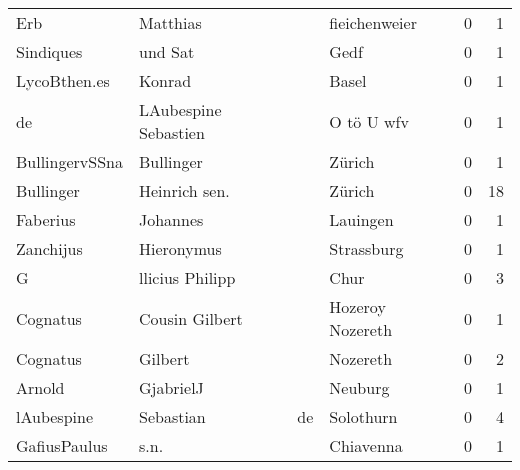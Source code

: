 \begin{tabular}{llllrr}
                      Erb &                           Matthias &             &                               fieichenweier &          0 &         1 \\
                Sindiques &                            und Sat &             &                                        Gedf &          0 &         1 \\
             LycoBthen.es &                             Konrad &             &                                       Basel &          0 &         1 \\
                       de &               LAubespine Sebastien &             &                                  O tö U wfv &          0 &         1 \\
           BullingervSSna &                          Bullinger &             &                                      Zürich &          0 &         1 \\
                Bullinger &                      Heinrich sen. &             &                                      Zürich &          0 &        18 \\
                 Faberius &                           Johannes &             &                                    Lauingen &          0 &         1 \\
                Zanchijus &                         Hieronymus &             &                                  Strassburg &          0 &         1 \\
                        G &                    llicius Philipp &             &                                        Chur &          0 &         3 \\
                 Cognatus &                     Cousin Gilbert &             &                            Hozeroy Nozereth &          0 &         1 \\
                 Cognatus &                            Gilbert &             &                                    Nozereth &          0 &         2 \\
                   Arnold &                          GjabrielJ &             &                                     Neuburg &          0 &         1 \\
               lAubespine &                          Sebastian &          de &                                   Solothurn &          0 &         4 \\
             GafiusPaulus &                               s.n. &             &                                   Chiavenna &          0 &         1 \\

\end{tabular}
